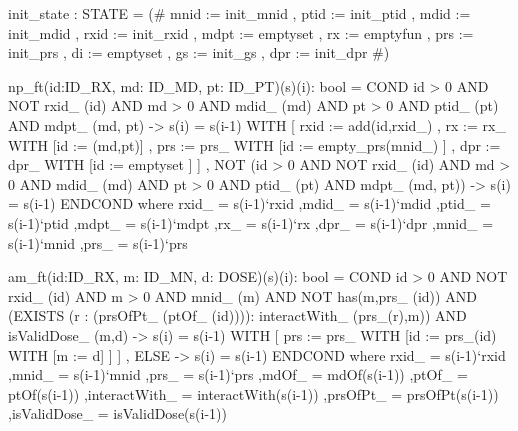 \begin{pvs}
  init_state : STATE =
       (# mnid := init_mnid
        , ptid := init_ptid
        , mdid := init_mdid
        , rxid := init_rxid
       	, mdpt := emptyset
        , rx := emptyfun
        , prs := init_prs
        , di := emptyset
        , gs := init_gs
        , dpr := init_dpr
        #)

  np_ft(id:ID_RX, md: ID_MD, pt: ID_PT)(s)(i): bool =
    COND
	id > 0
	AND NOT rxid_ (id)
	AND md > 0
        AND mdid_ (md)
	AND pt > 0
        AND ptid_ (pt)
	AND mdpt_ (md, pt) ->
	       s(i) = s(i-1) WITH  [ rxid := add(id,rxid_)
		            , rx  := rx_ WITH [id := (md,pt)]
			    , prs := prs_ WITH [id := empty_prs(mnid_) ]
			    , dpr := dpr_ WITH [id := emptyset ] 
			    ] ,
        NOT (id > 0
        AND NOT rxid_ (id)
        AND md > 0
        AND mdid_ (md)
        AND pt > 0
        AND ptid_ (pt)
        AND mdpt_ (md, pt))
          -> s(i) = s(i-1)
    ENDCOND
    where
       rxid_ = s(i-1)`rxid
      ,mdid_ = s(i-1)`mdid
      ,ptid_ = s(i-1)`ptid
      ,mdpt_ = s(i-1)`mdpt
      ,rx_   = s(i-1)`rx
      ,dpr_  = s(i-1)`dpr
      ,mnid_ = s(i-1)`mnid
      ,prs_ = s(i-1)`prs
      
  am_ft(id:ID_RX, m: ID_MN, d: DOSE)(s)(i): bool =
    COND
	id > 0 AND NOT rxid_ (id)
	AND m > 0 AND mnid_ (m)
	AND NOT has(m,prs_ (id))
	AND (EXISTS (r : (prsOfPt_ (ptOf_ (id)))): interactWith_ (prs_(r),m))
	AND isValidDose_ (m,d)
            -> s(i) = s(i-1) WITH [ prs := prs_ WITH [id := prs_(id) WITH [m := d] ] ]
     , ELSE
        -> s(i) = s(i-1)
    ENDCOND
    where
       rxid_ = s(i-1)`rxid
      ,mnid_ = s(i-1)`mnid
      ,prs_  = s(i-1)`prs
      ,mdOf_ = mdOf(s(i-1))
      ,ptOf_ = ptOf(s(i-1))
      ,interactWith_ = interactWith(s(i-1))
      ,prsOfPt_ = prsOfPt(s(i-1))
      ,isValidDose_ = isValidDose(s(i-1))



\end{pvs}
